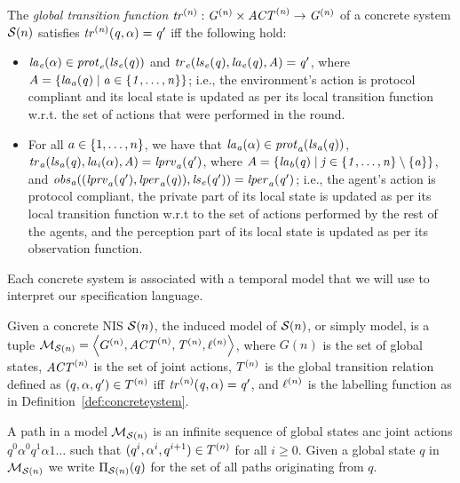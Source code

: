 \begin{definition} 
  \label{def:globaltransition}
  The {\em global transition function} $\it{tr}^{(n)} : G^{(n)}
  \times \it{ACT}^{(n)} \rightarrow G^{(n)}$ of a concrete system $\mathcal{S}(n)$
  satisfies $\it{tr}^{(n)}(q, \alpha) = q'$ iff the following hold:
  \begin{itemize}
    \item $\it{la}_{e}({\alpha}) \in \it{prot}_{e}({\it{ls}_{e}(q)})$ and $\it{tr}_{e}(\it{ls}_{e}(q),
    \it{la}_{e}({q}), A) = q'$, where $A = \left \{ \it{la}_{a}({q}) \mid a \in
    \left \{ 1,\ldots,n \right \} \right \}$; i.e., the environment’s action is protocol compliant and
    its local state is updated as per its local transition function w.r.t. the
    set of actions that were performed in the round. 

    \item For all $a \in \left \{ 1,\ldots,n \right \}$, we have that $\it{la}_{a}({\alpha}) \in
    \it{prot}_{a}(\it{ls}_{a}(q))$, $\it{tr}_{a} (\it{ls}_{a}(q), \it{la}_{i}({\alpha}), A) = \it{lprv}_{a}(q')$,
    where $A = \left \{ \it{la}_{b}({q}) \mid j \in \left \{ 1,\ldots,n \right \} \setminus \left \{ a \right \} \right \}$,
    and $\it{obs}_{a}((\it{lprv}_{a}(q'),\it{lper}_{a}(q)),\it{ls}_{e}(q')) = \it{lper}_{a}(q')$; i.e.,
    the agent's action is protocol compliant, the private part of its local
    state is updated as per its local transition function w.r.t to the set of
    actions performed by the rest of the agents, and the perception part of its
    local state is updated as per its observation function.
  \end{itemize}
\end{definition}


Each concrete system is associated with a temporal model 
that we will use  to interpret our specification language.

\begin{definition}[Model]
  \label{def:model}
  Given a concrete NIS $\mathcal{S}(n)$, the induced model of $\mathcal{S}(n)$, or simply model,
  is a tuple $\mathcal{M}_{\mathcal{S}(n)} = \left \langle G^{(n)}, \it{ACT}^{(n)}, T^{(n)},
  \ell^{(n)} \right \rangle$, where $G(n)$ is the set of global states, $\it{ACT}^{(n)}$ is the
  set of joint actions, $T^{(n)}$ is the global transition relation defined
  as $(q, \alpha, q') \in T^{(n)}$ iff $\it{tr}^{(n)}(q, \alpha) = q'$, and 
  $\ell^{(n)}$ is the labelling function as in
  Definition~\ref{def:concreteystem}.
\end{definition}

A path in a model $\mathcal{M}_{\mathcal{S}(n)}$ is an infinite sequence of global states anc joint
actions $q^0\alpha^0q^1\alpha1\ldots$ such that $(q^i,\alpha^i,q^{i+1}) \in
T^{(n)}$ for all $i \geq 0$. Given a global state $q$ in $\mathcal{M}_{\mathcal{S}(n)}$ we write
$\Pi_{\mathcal{S}(n)}(q)$ for the set of all paths originating from $q$.
  
